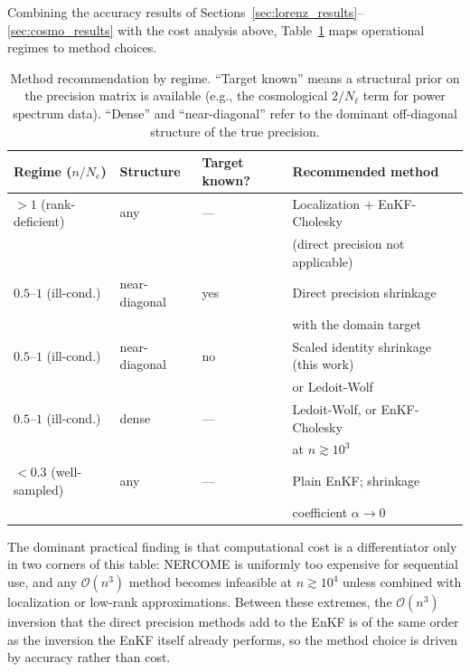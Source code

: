 Combining the accuracy results of Sections~\ref{sec:lorenz_results}--\ref{sec:cosmo_results} with the cost analysis above, Table~\ref{tab:method_recommendation} maps operational regimes to method choices.

\begin{table}[t]
\centering
\caption{Method recommendation by regime. ``Target known'' means a structural prior on the precision matrix is available (e.g., the cosmological $2/N_\ell$ term for power spectrum data). ``Dense'' and ``near-diagonal'' refer to the dominant off-diagonal structure of the true precision.}
\label{tab:method_recommendation}
\small
\begin{tabular}{@{}llll@{}}
\toprule
Regime ($n/N_e$) & Structure & Target known? & Recommended method \\
\midrule
$> 1$ (rank-deficient)        & any            & ---  & Localization + EnKF-Cholesky \\[2pt]
                              &                &      & (direct precision not applicable) \\
\midrule
$0.5$--$1$ (ill-cond.)        & near-diagonal  & yes  & Direct precision shrinkage \\[2pt]
                              &                &      & with the domain target \\
$0.5$--$1$ (ill-cond.)        & near-diagonal  & no   & Scaled identity shrinkage (this work) \\[2pt]
                              &                &      & or Ledoit-Wolf \\
$0.5$--$1$ (ill-cond.)        & dense          & ---  & Ledoit-Wolf, or EnKF-Cholesky \\[2pt]
                              &                &      & at $n \gtrsim 10^3$ \\
\midrule
$< 0.3$ (well-sampled)        & any            & ---  & Plain EnKF; shrinkage \\[2pt]
                              &                &      & coefficient $\alpha \to 0$ \\
\bottomrule
\end{tabular}
\end{table}

The dominant practical finding is that computational cost is a differentiator only in two corners of this table: NERCOME is uniformly too expensive for sequential use, and any $\mathcal{O}(n^3)$ method becomes infeasible at $n \gtrsim 10^4$ unless combined with localization or low-rank approximations. Between these extremes, the $\mathcal{O}(n^3)$ inversion that the direct precision methods add to the EnKF is of the same order as the inversion the EnKF itself already performs, so the method choice is driven by accuracy rather than cost.

